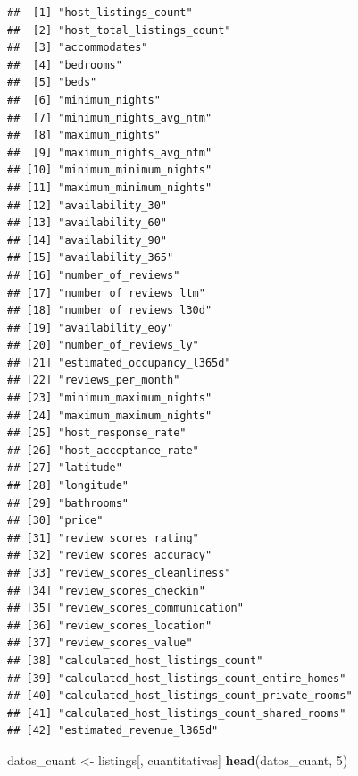 \documentclass[
]{article}
\newenvironment{Shaded}{\begin{snugshade}}{\end{snugshade}}
\newcommand{\DecValTok}[1]{\textcolor[rgb]{0.00,0.00,0.81}{#1}}
\newcommand{\FunctionTok}[1]{\textcolor[rgb]{0.13,0.29,0.53}{\textbf{#1}}}
\newcommand{\NormalTok}[1]{#1}
\newcommand{\OtherTok}[1]{\textcolor[rgb]{0.56,0.35,0.01}{#1}}
\begin{document}
\begin{verbatim}
##  [1] "host_listings_count"                         
##  [2] "host_total_listings_count"                   
##  [3] "accommodates"                                
##  [4] "bedrooms"                                    
##  [5] "beds"                                        
##  [6] "minimum_nights"                              
##  [7] "minimum_nights_avg_ntm"                      
##  [8] "maximum_nights"                              
##  [9] "maximum_nights_avg_ntm"                      
## [10] "minimum_minimum_nights"                      
## [11] "maximum_minimum_nights"                      
## [12] "availability_30"                             
## [13] "availability_60"                             
## [14] "availability_90"                             
## [15] "availability_365"                            
## [16] "number_of_reviews"                           
## [17] "number_of_reviews_ltm"                       
## [18] "number_of_reviews_l30d"                      
## [19] "availability_eoy"                            
## [20] "number_of_reviews_ly"                        
## [21] "estimated_occupancy_l365d"                   
## [22] "reviews_per_month"                           
## [23] "minimum_maximum_nights"                      
## [24] "maximum_maximum_nights"                      
## [25] "host_response_rate"                          
## [26] "host_acceptance_rate"                        
## [27] "latitude"                                    
## [28] "longitude"                                   
## [29] "bathrooms"                                   
## [30] "price"                                       
## [31] "review_scores_rating"                        
## [32] "review_scores_accuracy"                      
## [33] "review_scores_cleanliness"                   
## [34] "review_scores_checkin"                       
## [35] "review_scores_communication"                 
## [36] "review_scores_location"                      
## [37] "review_scores_value"                         
## [38] "calculated_host_listings_count"              
## [39] "calculated_host_listings_count_entire_homes" 
## [40] "calculated_host_listings_count_private_rooms"
## [41] "calculated_host_listings_count_shared_rooms" 
## [42] "estimated_revenue_l365d"
\end{verbatim}

\begin{Shaded}
\begin{Highlighting}[]
\NormalTok{datos\_cuant }\OtherTok{\textless{}{-}}\NormalTok{ listings[, cuantitativas]}
\FunctionTok{head}\NormalTok{(datos\_cuant, }\DecValTok{5}\NormalTok{)}
\end{Highlighting}
\end{Shaded}
\end{document}
